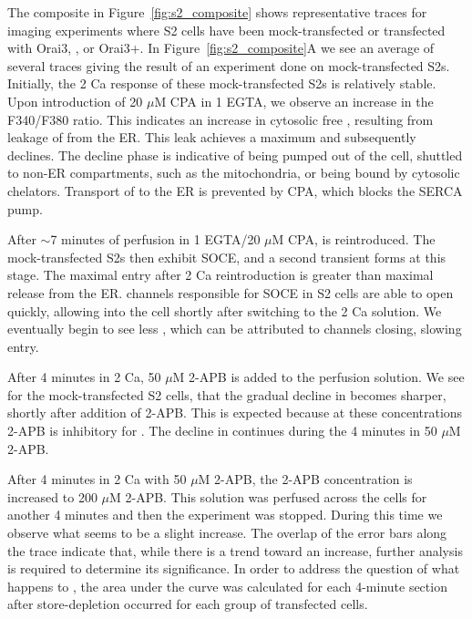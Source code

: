 The composite in Figure~\ref{fig:s2_composite} shows representative traces for \Ca{} imaging experiments where S2 cells have been mock-transfected or transfected with Orai3, \stim{}, or Orai3+\stim.
In Figure~\ref{fig:s2_composite}A we see an average of several traces giving the result of an experiment done on mock-transfected S2s. Initially, the 2 Ca response of these mock-transfected S2s is relatively stable. Upon introduction of 20 $\mu$M CPA in 1 EGTA, we observe an increase in the F340/F380 ratio. This indicates an increase in cytosolic free \Ca, resulting from leakage of \Ca{} from the ER. This \Ca{} leak achieves a maximum and subsequently declines. The decline phase is indicative of \Ca{} being pumped out of the cell, shuttled to non-ER compartments, such as the mitochondria, or being bound by cytosolic \Ca{} chelators. Transport of \Ca{} to the ER is prevented by CPA, which blocks the SERCA pump. 

After $\sim$7 minutes of perfusion in 1 EGTA/20 $\mu$M CPA, \Ca{} is reintroduced. The mock-transfected S2s then exhibit SOCE, and a second \Ca{} transient forms at this stage. The maximal \Ca{} entry after 2 Ca reintroduction is greater than maximal \Ca{} release from the ER.  \dorai{} channels responsible for SOCE in S2 cells are able to open quickly, allowing \Ca{} into the cell shortly after switching to the 2 Ca solution.
We eventually begin to see less \Ca, which can be attributed to \dorai{} channels closing, slowing \Ca{} entry.

After 4 minutes in 2 Ca, 50 $\mu$M 2-APB is added to the perfusion solution. We see for the mock-transfected S2 cells, that the gradual decline in \Ca{} becomes sharper, shortly after addition of 2-APB. This is expected because at these concentrations 2-APB is inhibitory for \dorai{} \citep{Yeromin:2004p520}. The decline in \Ca{} continues during the 4 minutes in 50 $\mu$M 2-APB. 

After 4 minutes in 2 Ca with 50 $\mu$M 2-APB, the 2-APB concentration is increased to 200 $\mu$M 2-APB. This solution was perfused across the cells for another 4 minutes and then the experiment was stopped. During this time we observe what seems to be a slight increase. The overlap of the error bars along the trace indicate that, while there is a trend toward an increase, further analysis is required to determine its significance. In order to address the question of what happens to \Ca{}, the area under the curve was calculated for each 4-minute section after store-depletion occurred for each group of transfected cells. 

